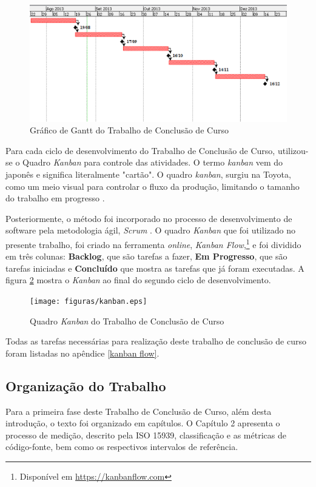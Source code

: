 \begin{figure}[h]
\centering
	\includegraphics[keepaspectratio=true,scale=0.7]{figuras/gantt_chart.eps}
	\caption{Gráfico de Gantt do Trabalho de Conclusão de Curso}
	\label{gantt}
\end{figure}

Para cada ciclo de desenvolvimento do Trabalho de Conclusão de Curso,  
utilizou-se o Quadro \textit{Kanban} para controle das atividades. 
O termo \textit{kanban} vem do japonês e significa literalmente "cartão". 
O quadro \textit{kanban}, surgiu na Toyota, como um meio visual para controlar o 
fluxo da produção, limitando o tamanho do trabalho em progresso 
\cite{moura1999kanban}.

Posteriormente, o método foi incorporado no processo de desenvolvimento de 
software pela metodologia ágil, \textit{Scrum} \cite{Schwaber:2004}. 
O quadro \textit{Kanban} 
que foi utilizado no presente trabalho, foi criado na ferramenta \textit{online}, 
\textit{Kanban Flow},\footnote{Disponível em \url{https://kanbanflow.com}} e foi
 dividido em três colunas: \textbf{Backlog}, que são tarefas a fazer, 
\textbf{Em Progresso}, que são tarefas iniciadas e \textbf{Concluído} que mostra
 as tarefas que já foram executadas. A figura \ref{kanban} mostra o 
 \textit{Kanban} ao final do segundo ciclo de 
desenvolvimento.

\begin{figure}[h]
\centering
	\texttt{[image: figuras/kanban.eps]}
	\caption{Quadro \textit{Kanban} do Trabalho de Conclusão de Curso}
	\label{kanban}
\end{figure}

Todas as tarefas necessárias para realização deste trabalho de conclusão de 
curso foram listadas no apêndice \ref{kanban flow}. 


\subsection{Organização do Trabalho}
Para a primeira fase deste Trabalho de Conclusão de Curso, além desta introdução, 
o texto foi organizado em capítulos. O Capítulo 2 apresenta o processo de 
medição, descrito pela ISO 15939, classificação e as métricas de código-fonte, 
bem como os respectivos intervalos de referência.


